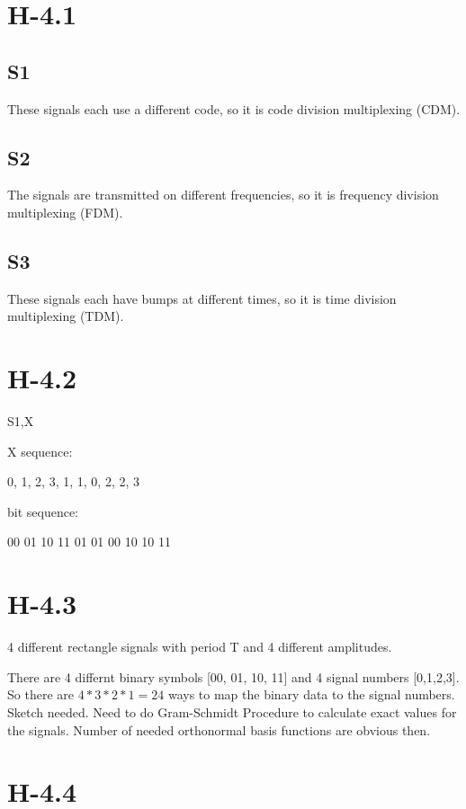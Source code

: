 \documentclass{article}
\begin{document}
\section{H-4.1}

\subsection{S1}

These signals each use a different code, so it is code division multiplexing (CDM).

\subsection{S2}

The signals are transmitted on different frequencies, so it is frequency division multiplexing (FDM).

\subsection{S3}

These signals each have bumps at different times, so it is time division multiplexing (TDM).


\section{H-4.2}

S1,X

X sequence:

0, 1, 2, 3, 1, 1, 0, 2, 2, 3

bit sequence:

00 01 10 11 01 01 00 10 10 11

\section{H-4.3}

4 different rectangle signals with period T and 4 different amplitudes.

There are 4 differnt binary symbols [00, 01, 10, 11] and 4 signal numbers [0,1,2,3].
So there are $4*3*2*1=24$ ways to map the binary data to the signal numbers. \\

Sketch needed.
Need to do Gram-Schmidt Procedure to calculate exact values for the signals.
Number of needed orthonormal basis functions are obvious then.


\section{H-4.4}
\end{document}

